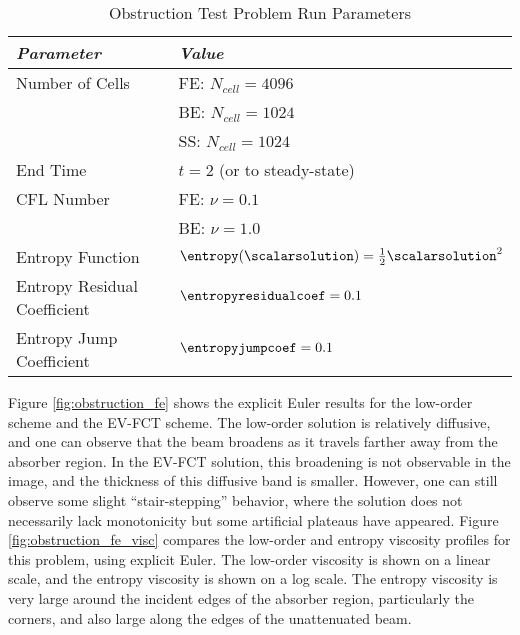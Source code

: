 \begin{table}[htb]\caption{Obstruction Test Problem Run Parameters}
\label{tab:obstruction_run}
\centering
\begin{tabular}{l l}\toprule
\emph{Parameter} & \emph{Value}\\\midrule
Number of Cells & FE: $N_{cell} = 4096$\\
                & BE: $N_{cell} = 1024$\\
                & SS: $N_{cell} = 1024$\\
End Time & $t = 2$ (or to steady-state)\\
CFL Number & FE: $\nu = 0.1$\\
           & BE: $\nu = 1.0$\\
\midrule
Entropy Function & $\entropy(\scalarsolution) = \frac{1}{2}\scalarsolution^2$\\
Entropy Residual Coefficient & $\entropyresidualcoef = 0.1$\\
Entropy Jump Coefficient & $\entropyjumpcoef = 0.1$\\
\bottomrule\end{tabular}
\end{table}

Figure \ref{fig:obstruction_fe} shows the explicit Euler results for the
low-order scheme and the EV-FCT scheme. The low-order solution
is relatively diffusive, and one can observe that the beam broadens as it
travels farther away from the absorber region. In the EV-FCT solution, this
broadening is not observable in the image, and the thickness of this
diffusive band is smaller. However, one can still observe some slight
``stair-stepping'' behavior, where the solution does not necessarily
lack monotonicity but some artificial plateaus have appeared.
Figure \ref{fig:obstruction_fe_visc} compares the low-order and entropy
viscosity profiles for this problem, using explicit Euler. The low-order
viscosity is shown on a linear scale, and the entropy viscosity is shown
on a log scale. The entropy viscosity is very large around the incident
edges of the absorber region, particularly the corners, and also
large along the edges of the unattenuated beam.

